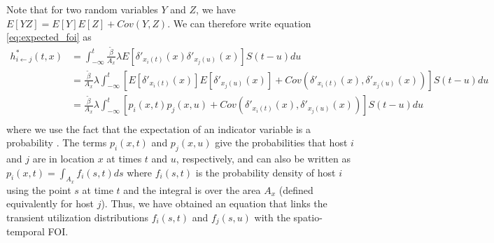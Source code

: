 \documentclass[letterpaper]{article}
\begin{document}
Note that for two random variables $Y$ and $Z$, we have $E[YZ] = E[Y]E[Z] + Cov(Y, Z)$.  We can therefore write equation \ref{eq:expected_foi} as
\begin{equation}
    \begin{aligned}
        h^*_{i \leftarrow j}(t, x) &= \int_{-\infty}^{t} \frac{\tilde{\beta}}{A_x} \lambda E[\delta'_{x_i(t)}(x) \delta'_{x_j(u)}(x)] S(t - u) du \\
        &= \frac{\tilde{\beta}}{A_x} \lambda \int_{-\infty}^{t} [E[\delta'_{x_i(t)}(x)] E[\delta'_{x_j(u)}(x)] + Cov(\delta'_{x_i(t)}(x), \delta'_{x_j(u)}(x))] S(t - u) du \\
        &= \frac{\tilde{\beta}}{A_x} \lambda \int_{-\infty}^{t} [p_i(x, t) p_j(x, u) + Cov(\delta'_{x_i(t)}(x), \delta'_{x_j(u)}(x))] S(t - u) du \\
    \end{aligned}
    \label{eq:foi_cov}
\end{equation}
where we use the fact that the expectation of an indicator variable is a probability \citep{Grimmett2001}. The terms $p_i(x, t)$ and $p_j(x,u)$ give the probabilities that host $i$ and $j$ are in location $x$ at times $t$ and $u$, respectively, and can also be written as $p_i(x, t) = \int_{A_x} f_i(s, t) ds$ where $f_i(s, t)$ is the probability density of host $i$ using the point $s$ at time $t$ and the integral is over the area $A_x$ (defined equivalently for host $j$). Thus, we have obtained an equation that links the transient utilization distributions $f_i(s, t)$ and $f_j(s, u)$ with the spatio-temporal FOI.


\end{document}

